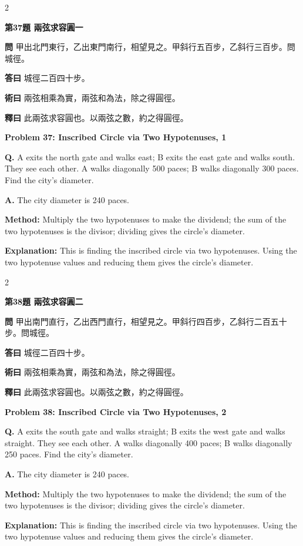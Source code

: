 \documentclass[11pt,a4paper]{article}
\newcommand{\wen}[1]{\noindent\textbf{問} #1\par\smallskip}
\newcommand{\da}[1]{\noindent\textbf{答曰} #1\par\smallskip}
\newcommand{\shu}[1]{\noindent\textbf{術曰} #1\par\smallskip}
\newcommand{\shi}[1]{\noindent\textbf{釋曰} #1\par\smallskip}
\newcommand{\wenE}[1]{\noindent\textbf{Q.} #1\par\smallskip}
\newcommand{\daE}[1]{\noindent\textbf{A.} #1\par\smallskip}
\newcommand{\shuE}[1]{\noindent\textbf{Method:} #1\par\smallskip}
\newcommand{\shiE}[1]{\noindent\textbf{Explanation:} #1\par\smallskip}
\begin{document}
\begin{paracol}{2}

\noindent\textbf{第37題 兩弦求容圓一}

\wen{甲出北門東行，乙出東門南行，相望見之。甲斜行五百步，乙斜行三百步。問城徑。}
\da{城徑二百四十步。}
\shu{兩弦相乘為實，兩弦和為法，除之得圓徑。}
\shi{此兩弦求容圓也。以兩弦之數，約之得圓徑。}

\switchcolumn

\noindent\textbf{Problem 37: Inscribed Circle via Two Hypotenuses, 1}

\wenE{A exits the north gate and walks east; B exits the east gate and walks south. They see each other. A walks diagonally 500 paces; B walks diagonally 300 paces. Find the city's diameter.}
\daE{The city diameter is 240 paces.}
\shuE{Multiply the two hypotenuses to make the dividend; the sum of the two hypotenuses is the divisor; dividing gives the circle's diameter.}
\shiE{This is finding the inscribed circle via two hypotenuses. Using the two hypotenuse values and reducing them gives the circle's diameter.}

\end{paracol}

\bigskip

\begin{paracol}{2}

\noindent\textbf{第38題 兩弦求容圓二}

\wen{甲出南門直行，乙出西門直行，相望見之。甲斜行四百步，乙斜行二百五十步。問城徑。}
\da{城徑二百四十步。}
\shu{兩弦相乘為實，兩弦和為法，除之得圓徑。}
\shi{此兩弦求容圓也。以兩弦之數，約之得圓徑。}

\switchcolumn

\noindent\textbf{Problem 38: Inscribed Circle via Two Hypotenuses, 2}

\wenE{A exits the south gate and walks straight; B exits the west gate and walks straight. They see each other. A walks diagonally 400 paces; B walks diagonally 250 paces. Find the city's diameter.}
\daE{The city diameter is 240 paces.}
\shuE{Multiply the two hypotenuses to make the dividend; the sum of the two hypotenuses is the divisor; dividing gives the circle's diameter.}
\shiE{This is finding the inscribed circle via two hypotenuses. Using the two hypotenuse values and reducing them gives the circle's diameter.}

\end{paracol}

\bigskip
\end{document}
